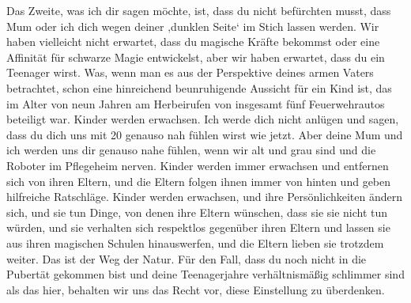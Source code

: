 \begin{writtenNote}
Das Zweite, was ich dir sagen möchte, ist, dass du nicht befürchten musst, dass Mum oder ich dich wegen deiner ‚dunklen Seite‘ im Stich lassen werden. Wir haben vielleicht nicht erwartet, dass du magische Kräfte bekommst oder eine Affinität für schwarze Magie entwickelst, aber wir haben erwartet, dass du ein Teenager wirst. Was, wenn man es aus der Perspektive deines armen Vaters betrachtet, schon eine hinreichend beunruhigende Aussicht für ein Kind ist, das im Alter von neun Jahren am Herbeirufen von insgesamt fünf Feuerwehrautos beteiligt war. Kinder werden erwachsen. Ich werde dich nicht anlügen und sagen, dass du dich uns mit 20 genauso nah fühlen wirst wie jetzt. Aber deine Mum und ich werden uns dir genauso nahe fühlen, wenn wir alt und grau sind und die Roboter im Pflegeheim nerven. Kinder werden immer erwachsen und entfernen sich von ihren Eltern, und die Eltern folgen ihnen immer von hinten und geben hilfreiche Ratschläge. Kinder werden erwachsen, und ihre Persönlichkeiten ändern sich, und sie tun Dinge, von denen ihre Eltern wünschen, dass sie sie nicht tun würden, und sie verhalten sich respektlos gegenüber ihren Eltern und lassen sie aus ihren magischen Schulen hinauswerfen, und die Eltern lieben sie trotzdem weiter. Das ist der Weg der Natur. Für den Fall, dass du noch nicht in die Pubertät gekommen bist und deine Teenagerjahre verhältnismäßig schlimmer sind als das hier, behalten wir uns das Recht vor, diese Einstellung zu überdenken.


\end{writtenNote}
